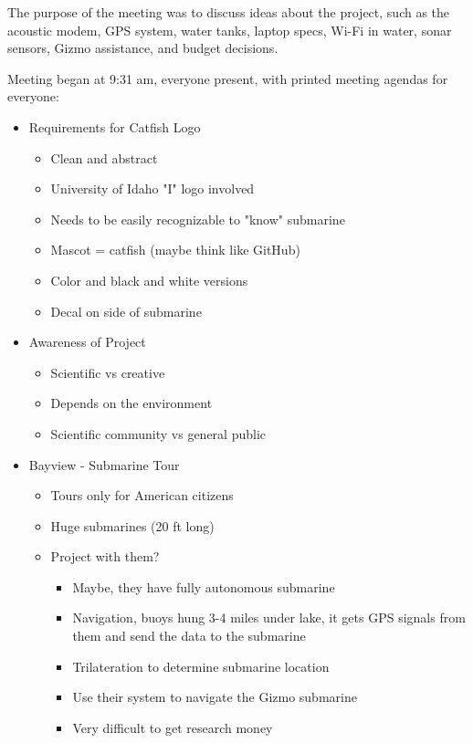\documentclass[12pt]{article}
\begin{document}
			\noindent
			The purpose of the meeting was to discuss ideas about the project, such as the acoustic modem, GPS system, water tanks, laptop specs, Wi-Fi in water, sonar sensors, Gizmo assistance, and budget decisions.
			
			\noindent
			Meeting began at 9:31 am, everyone present, with printed meeting agendas for everyone:
			
			\noindent
			\begin{itemize}
				\item Requirements for Catfish Logo
				\begin{itemize}
					\item Clean and abstract
					\item University of Idaho "I" logo involved
					\item Needs to be easily recognizable to "know" submarine
					\item Mascot = catfish (maybe think like GitHub)
					\item Color and black and white versions
					\item Decal on side of submarine
				\end{itemize}
				\item Awareness of Project
				\begin{itemize}
					\item Scientific vs creative
					\item Depends on the environment
					\item Scientific community vs general public
				\end{itemize}
				\item Bayview - Submarine Tour
				\begin{itemize}
					\item Tours only for American citizens
					\item Huge submarines (20 ft long)
					\item Project with them?
					\begin{itemize}
						\item Maybe, they have fully autonomous submarine
						\item Navigation, buoys hung 3-4 miles under lake, it gets GPS signals from them and send the data to the submarine
						\item Trilateration to determine submarine location
						\item Use their system to navigate the Gizmo submarine
						\item Very difficult to get research money 

\end{itemize}
\end{itemize}
\end{itemize}
\end{document}
